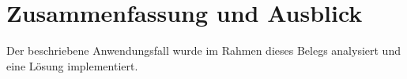 \clearpage
\section{Zusammenfassung und Ausblick}
\label{sec:4}
Der beschriebene Anwendungsfall wurde im Rahmen dieses Belegs analysiert und eine Lösung implementiert. 